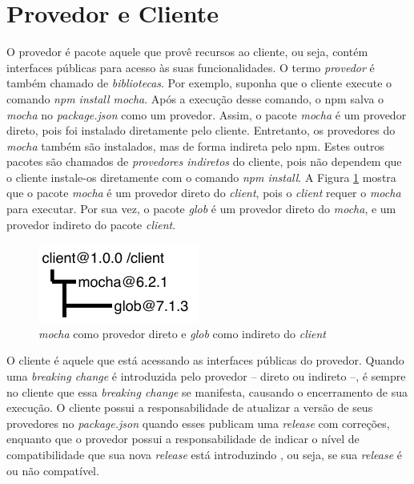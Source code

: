 \section{Provedor e Cliente}
\label{ref-teo:prov_clie}
O provedor é pacote aquele que provê recursos ao cliente, ou seja, contém interfaces públicas para acesso às suas funcionalidades. O termo \textit{provedor} é também chamado de \textit{bibliotecas}. Por exemplo, suponha que o cliente execute o comando \textit{npm install mocha}. Após a execução desse comando, o \gls{npm} salva o \textit{mocha} no \textit{package.json} como um provedor. Assim, o pacote \textit{mocha} é um provedor direto, pois foi instalado diretamente pelo cliente. Entretanto, os provedores do \textit{mocha} também são instalados, mas de forma indireta pelo \gls{npm}. Estes outros pacotes são chamados de \textit{provedores indiretos} do cliente, pois não dependem que o cliente instale-os diretamente com o comando \textit{npm install}. A Figura \ref{fig:provider} mostra que o pacote \textit{mocha} é um provedor direto do \textit{client}, pois o \textit{client} requer o \textit{mocha} para executar. Por sua vez, o pacote \textit{glob} é um provedor direto do \textit{mocha}, e um provedor indireto do pacote \textit{client}.

\begin{figure}
    \centering
    \includegraphics[scale=1.4]{figuras/provider_directly_undirectly.pdf}
    \caption{\textit{mocha} como provedor direto e \textit{glob} como indireto do \textit{client}}
    \label{fig:provider}
\end{figure}{}

O cliente é aquele que está acessando as interfaces públicas do provedor. Quando uma \textit{breaking change} é introduzida pelo provedor -- direto ou indireto --, é sempre no cliente que essa \textit{breaking change} se manifesta, causando o encerramento de sua execução. O cliente possui a responsabilidade de atualizar a versão de seus provedores no \textit{package.json} quando esses publicam uma \textit{release} com correções, enquanto que o provedor possui a responsabilidade de indicar o nível de compatibilidade que sua nova \textit{release} está introduzindo \cite{teorical_reference:semver}, ou seja, se sua \textit{release} é ou não compatível.

